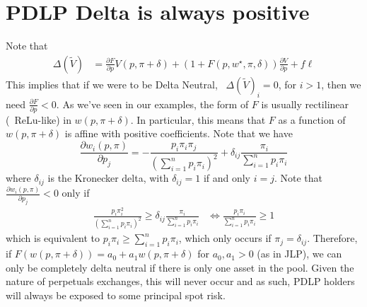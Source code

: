 \section{PDLP Delta is always positive}\label{app:delta}
Note that
\begin{align}\label{eq:portfolio-delta}
\Delta(\tilde{V}) &= \frac{\partial F}{\partial p} V(p, \pi + \delta) + (1+F(p, w^{\star}, \pi, \delta)) \frac{\partial V}{\partial p} + f \ell
\end{align}
This implies that if we were to be Delta Neutral, \ie~$\Delta(\tilde{V})_i = 0$, for $i > 1$, then we need $\frac{\partial F}{\partial p} < 0$.
As we've seen in our examples, the form of $F$ is usually rectilinear (\eg~ReLu-like) in $w(p, \pi+\delta)$.
In particular, this means that $F$ as a function of $w(p, \pi+\delta)$ is affine with positive coefficients.
Note that we have
\begin{equation}\label{eq:weight-derivative}
\frac{\partial w_i(p, \pi)}{\partial p_j} = - \frac{p_i \pi_i \pi_j}{\left(\sum_{i=1}^n p_i \pi_i\right)^2} + \delta_{ij} \frac{\pi_i}{\sum_{i=1}^n p_i \pi_i}
\end{equation}
where $\delta_{ij}$ is the Kronecker delta, with $\delta_{ij} = 1$ if and only $i = j$.
Note that $\frac{\partial w_i(p, \pi)}{\partial p_j} < 0$ only if 
\begin{align*}
\frac{p_i \pi_i^2}{\left(\sum_{i=1}^n p_i \pi_i\right)^2} \geq \delta_{ij} \frac{\pi_i}{\sum_{i=1}^n p_i \pi_i} &\iff \frac{p_i \pi_i}{\sum_{i=1}^n p_i \pi_i} \geq 1  
\end{align*}
which is equivalent to $p_i \pi_i \geq \sum_{i=1}^n p_i \pi_i$, which only occurs if $\pi_j = \delta_{ij}$.
Therefore, if $F(w(p, \pi+\delta)) = a_0 + a_1 w(p, \pi + \delta)$ for $a_0, a_1 > 0$ (as in JLP), we can only be completely delta neutral if there is only one asset in the pool.
Given the nature of perpetuals exchanges, this will never occur and as such, PDLP holders will always be exposed to some principal spot risk.
